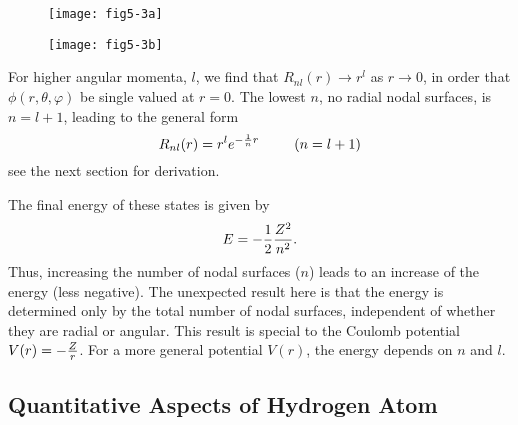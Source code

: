 \begin{figure}
\texttt{[image: fig5-3a]}
\caption{}
\label{fig5-3a}
\end{figure}

\begin{figure}
\texttt{[image: fig5-3b]}
\caption{}
\label{fig5-3b}
\end{figure}

For higher angular momenta, $l$, we find that $R_{nl}(r) \rightarrow r^l$ 
as $r \rightarrow 0$, in order that $\phi ( r , \theta , \varphi )$
be single valued at $r = 0$.  The lowest $n$, no radial nodal surfaces, 
is $n = l + 1$, leading to the general form
\begin{equation}
R_{nl} (r) = r^l e^{- {1 \over n}r} ~~~~~~~\left( n = l + 1 \right)
\end{equation}
see the next section for derivation.

The final energy of these states is given by
\begin{equation}
E = - {1 \over 2} {Z^2 \over n^2} .
\end{equation}
Thus, increasing the number of nodal surfaces ($n$) leads to an
increase of the energy (less negative). The unexpected result here is
that the energy is determined only by the total number of nodal
surfaces, independent of whether they are radial or angular. This
result is special to the Coulomb potential $V(r) = - {Z \over r}$.
For a more general potential $V(r)$, the energy depends on $n$ and $l$.

\subsection{Quantitative Aspects of Hydrogen Atom}

